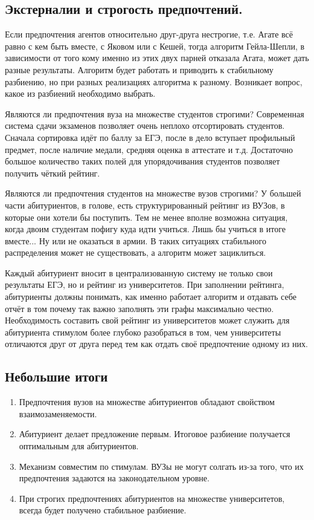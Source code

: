\documentclass[pdftex, 12pt, a4paper]{article}
\begin{document}
\subsection*{Экстерналии и строгость предпочтений.} 

Если предпочтения агентов относительно друг-друга нестрогие, т.е. Агате всё равно с кем быть вместе, с Яковом или с Кешей, тогда алгоритм Гейла-Шепли, в зависимости от того кому именно из этих двух парней отказала Агата, может дать разные результаты. Алгоритм будет работать и приводить к стабильному разбиению, но при разных реализациях алгоритма к разному. Возникает вопрос, какое из разбиений необходимо выбрать.  

Являются ли предпочтения вуза на множестве студентов строгими? Современная система сдачи экзаменов позволяет очень неплохо отсортировать студентов. Сначала сортировка идёт по баллу за ЕГЭ, после в дело вступает профильный предмет, после наличие медали, средняя оценка в аттестате и т.д. Достаточно большое количество таких полей для упорядочивания студентов позволяет получить чёткий рейтинг. 

Являются ли предпочтения студентов на множестве вузов строгими? У большей части абитуриентов, в голове, есть структурированный рейтинг из ВУЗов, в которые они хотели бы поступить.  Тем не менее вполне возможна ситуация, когда двоим студентам пофигу куда идти учиться. Лишь бы учиться в итоге вместе... Ну или не оказаться в армии. В таких ситуациях стабильного распределения может не существовать, а алгоритм может зациклиться.

Каждый абитуриент вносит в централизованную систему не только свои результаты ЕГЭ, но и рейтинг из университетов. При заполнении рейтинга, абитуриенты должны понимать, как именно работает алгоритм и отдавать себе отчёт в том почему так важно заполнять эти графы максимально честно. Необходимость составить свой рейтинг из университетов может служить для абитуриента стимулом более глубоко разобраться в том, чем университеты отличаются друг от друга перед тем как отдать своё предпочтение одному из них. 

\subsection*{Небольшие итоги}

\begin{enumerate}
\item Предпочтения вузов на множестве абитуриентов обладают свойством взаимозаменяемости. 

\item Абитуриент делает предложение первым. Итоговое разбиение получается оптимальным для абитуриентов. 

\item Механизм совместим по стимулам. ВУЗы не могут солгать из-за того, что их предпочтения задаются на законодательном уровне.  

\item При строгих предпочтениях абитуриентов на множестве университетов, всегда будет получено стабильное разбиение. 

\end{enumerate} 
\end{document}
